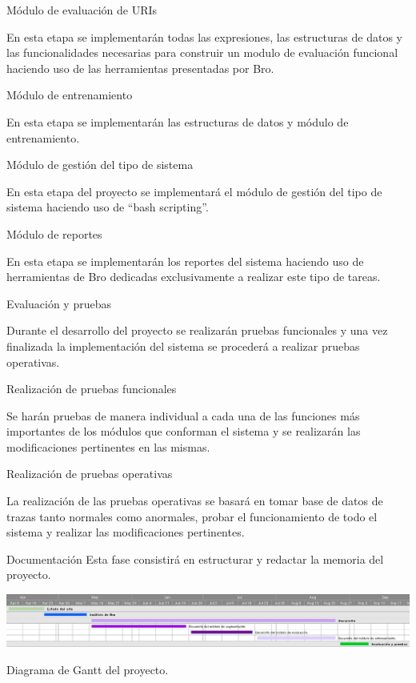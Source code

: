\begin{legal}
\begin{legal}
\item Módulo de evaluación de URIs 

En esta etapa  se implementarán todas las expresiones, las estructuras de datos y las funcionalidades necesarias para construir un modulo de evaluación funcional haciendo uso de las herramientas presentadas por Bro. 

\item Módulo de entrenamiento 

En esta etapa se implementarán las estructuras de datos y módulo de entrenamiento.

\item Módulo de gestión del tipo de sistema

En esta etapa del proyecto se implementará el módulo de gestión del tipo de sistema haciendo uso de ``bash scripting''. 

\item Módulo de reportes

En esta etapa se implementarán los reportes del sistema haciendo uso de herramientas de Bro dedicadas exclusivamente a realizar este tipo de tareas.

\end{legal}
\item Evaluación y pruebas 

Durante el desarrollo del proyecto se realizarán pruebas funcionales y una vez finalizada la implementación del sistema se procederá a realizar pruebas operativas.
\begin{legal}
\item Realización de pruebas funcionales

Se harán pruebas de manera individual a cada una de las funciones más importantes de los módulos que conforman el sistema y se realizarán las modificaciones pertinentes en las mismas.

\item Realización de pruebas operativas

La realización de las pruebas operativas se basará en tomar base de datos de trazas tanto normales como anormales, probar el funcionamiento de todo el sistema y realizar las modificaciones pertinentes.

\end{legal}

\item Documentación  
 Esta fase consistirá en estructurar y redactar la memoria del proyecto.
\end{legal}

\begin{table}[tb]
\begin{center}
\includegraphics[width=6in]{./img/pasantia.png}
\caption{Diagrama de Gantt del proyecto.}\label{fig1}
\end{center}
\end{table}
